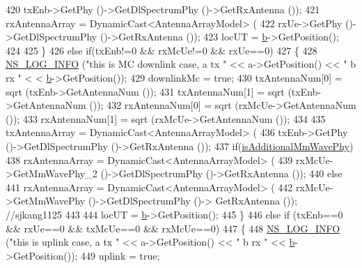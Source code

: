 \begin{DoxyCode}
420                                         txEnb->GetPhy ()->GetDlSpectrumPhy ()->GetRxAntenna ());
421                 rxAntennaArray = DynamicCast<AntennaArrayModel> (
422                                         rxUe->GetPhy ()->GetDlSpectrumPhy ()->GetRxAntenna ());
423                 locUT = \hyperlink{buildings__pathloss_8m_a21ad0bd836b90d08f4cf640b4c298e7c}{b}->GetPosition();
424 
425         \}
426         \textcolor{keywordflow}{else} \textcolor{keywordflow}{if}(txEnb!=0 && rxMcUe!=0 && rxUe==0)
427         \{
428                 \hyperlink{group__logging_gafbd73ee2cf9f26b319f49086d8e860fb}{NS\_LOG\_INFO} (\textcolor{stringliteral}{"this is MC downlink case, a tx "} << a->GetPosition() << \textcolor{stringliteral}{" b rx "} <
      < \hyperlink{buildings__pathloss_8m_a21ad0bd836b90d08f4cf640b4c298e7c}{b}->GetPosition());
429                 downlinkMc = \textcolor{keyword}{true};
430                 txAntennaNum[0] = sqrt (txEnb->GetAntennaNum ());
431                 txAntennaNum[1] = sqrt (txEnb->GetAntennaNum ());
432                 rxAntennaNum[0] = sqrt (rxMcUe->GetAntennaNum ());
433                 rxAntennaNum[1] = sqrt (rxMcUe->GetAntennaNum ());
434 
435                 txAntennaArray = DynamicCast<AntennaArrayModel> (
436                                         txEnb->GetPhy ()->GetDlSpectrumPhy ()->GetRxAntenna ());
437                 \textcolor{keywordflow}{if}(\hyperlink{classns3_1_1MmWave3gppChannel_a5b921c4b6e89174bf383382c1ce6523f}{isAdditionalMmWavePhy})
438                 rxAntennaArray = DynamicCast<AntennaArrayModel> (
439                                         rxMcUe->GetMmWavePhy\_2 ()->GetDlSpectrumPhy ()->GetRxAntenna ());
440                 \textcolor{keywordflow}{else}
441                         rxAntennaArray = DynamicCast<AntennaArrayModel> (
442                                                         rxMcUe->GetMmWavePhy ()->GetDlSpectrumPhy ()->
      GetRxAntenna ()); \textcolor{comment}{//sjkang1125}
443 
444                 locUT = \hyperlink{buildings__pathloss_8m_a21ad0bd836b90d08f4cf640b4c298e7c}{b}->GetPosition();              
445         \}
446         \textcolor{keywordflow}{else} \textcolor{keywordflow}{if} (txEnb==0 && rxUe==0 && txMcUe==0 && rxMcUe==0)
447         \{
448                 \hyperlink{group__logging_gafbd73ee2cf9f26b319f49086d8e860fb}{NS\_LOG\_INFO} (\textcolor{stringliteral}{"this is uplink case, a tx "} << a->GetPosition() << \textcolor{stringliteral}{" b rx "} << 
      \hyperlink{buildings__pathloss_8m_a21ad0bd836b90d08f4cf640b4c298e7c}{b}->GetPosition());
449                 uplink = \textcolor{keyword}{true};

\end{DoxyCode}
